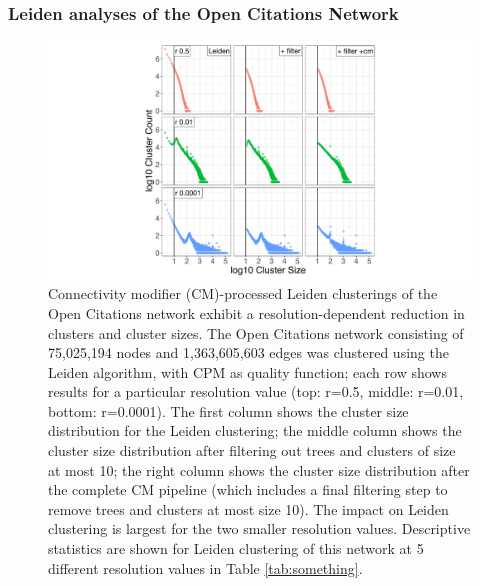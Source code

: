 \documentclass[11pt]{article}   	%
\begin{document}
\subsubsection{Leiden analyses of the Open Citations Network}

\begin{figure}[H]
\centering
\includegraphics[width=0.8\linewidth]{figs/fig1_kn.pdf}
\caption{Connectivity modifier (CM)-processed Leiden clusterings of the Open Citations network exhibit a resolution-dependent reduction in clusters and cluster sizes.
The Open Citations network consisting of 75,025,194 nodes and 1,363,605,603 edges was clustered using the Leiden algorithm, with CPM as quality function; each row shows results for a particular resolution value (top: r=0.5, middle: r=0.01, bottom: r=0.0001).
The first column shows the cluster size distribution for the Leiden clustering; the middle column shows the cluster size distribution after filtering out trees and clusters of size at most 10; the right column shows the cluster size distribution after the complete CM pipeline (which includes a final filtering step to remove trees and clusters at most size 10).
The impact on Leiden clustering is largest for the two smaller resolution values.
Descriptive statistics are shown for Leiden clustering of this network at 5 different resolution values in Table \ref{tab:something}.}
\label{fig:oc_size_count_plots}
\end{figure}
\end{document}
